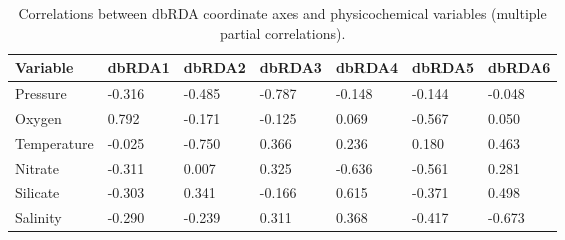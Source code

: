 \begin{table}[!hptb]
\centering
\sffamily
\caption[Correlations between dbRDA axes and physicochemical variables]{Correlations between dbRDA coordinate axes and physicochemical variables (multiple partial correlations).}
\label{tab:dbRDAcorrs}
\begin{tabu}{lZZZZZZ}
\toprule
\textbf{Variable} & \textbf{dbRDA1} & \textbf{dbRDA2} & \textbf{dbRDA3} & \textbf{dbRDA4} & \textbf{dbRDA5} & \textbf{dbRDA6}\\
\midrule
Pressure & -0.316 & -0.485 & -0.787 & -0.148 & -0.144 & -0.048\\
Oxygen & 0.792 & -0.171 & -0.125 & 0.069 & -0.567 & 0.050\\
Temperature & -0.025 & -0.750 & 0.366 & 0.236 & 0.180 & 0.463\\
Nitrate & -0.311 & 0.007 & 0.325 & -0.636 & -0.561 & 0.281\\
Silicate & -0.303 & 0.341 & -0.166 & 0.615 & -0.371 & 0.498\\
Salinity & -0.290 & -0.239 & 0.311 & 0.368 & -0.417 & -0.673\\
\bottomrule
\end{tabu}
\end{table}
